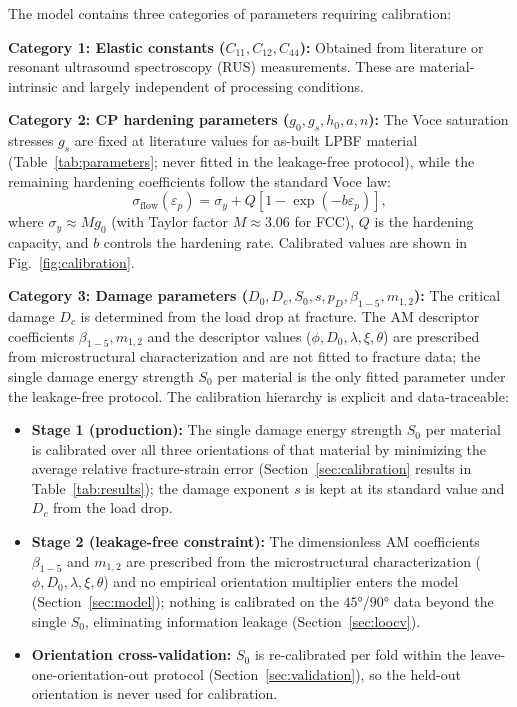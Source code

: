 \documentclass[twocolumn]{sagej}
\begin{document}
The model contains three categories of parameters requiring calibration:

\textbf{Category 1: Elastic constants ($C_{11}, C_{12}, C_{44}$):} Obtained from literature or resonant ultrasound spectroscopy (RUS) measurements. These are material-intrinsic and largely independent of processing conditions.

\textbf{Category 2: CP hardening parameters ($g_0, g_s, h_0, a, n$):} The Voce saturation stresses $g_s$ are fixed at literature values for as-built LPBF material (Table~\ref{tab:parameters}; never fitted in the leakage-free protocol), while the remaining hardening coefficients follow the standard Voce law:
\begin{equation}
\sigma_{\mathrm{flow}}(\varepsilon_p) = \sigma_y + Q \left[1 - \exp(-b\varepsilon_p)\right],
\label{eq:voce_flow}
\end{equation}
where $\sigma_y \approx M g_0$ (with Taylor factor $M \approx 3.06$ for FCC), $Q$ is the hardening capacity, and $b$ controls the hardening rate. Calibrated values are shown in Fig.~\ref{fig:calibration}.

\textbf{Category 3: Damage parameters ($D_0, D_c, S_0, s, p_D, \beta_{1-5}, m_{1,2}$):} The critical damage $D_c$ is determined from the load drop at fracture. The AM descriptor coefficients $\beta_{1-5}, m_{1,2}$ and the descriptor values ($\phi, D_0, \lambda, \xi, \theta$) are prescribed from microstructural characterization and are not fitted to fracture data; the single damage energy strength $S_0$ per material is the only fitted parameter under the leakage-free protocol. The calibration hierarchy is explicit and data-traceable:

\begin{itemize}
    \item \textbf{Stage 1 (production):} The single damage energy strength $S_0$ per material is calibrated over all three orientations of that material by minimizing the average relative fracture-strain error (Section~\ref{sec:calibration} results in Table~\ref{tab:results}); the damage exponent $s$ is kept at its standard value and $D_c$ from the load drop.
    \item \textbf{Stage 2 (leakage-free constraint):} The dimensionless AM coefficients $\beta_{1-5}$ and $m_{1,2}$ are prescribed from the microstructural characterization ($\phi, D_0, \lambda, \xi, \theta$) and no empirical orientation multiplier enters the model (Section~\ref{sec:model}); nothing is calibrated on the $\ang{45}$/$\ang{90}$ data beyond the single $S_0$, eliminating information leakage (Section~\ref{sec:loocv}).
    \item \textbf{Orientation cross-validation:} $S_0$ is re-calibrated per fold within the leave-one-orientation-out protocol (Section~\ref{sec:validation}), so the held-out orientation is never used for calibration.
\end{itemize}
\end{document}
